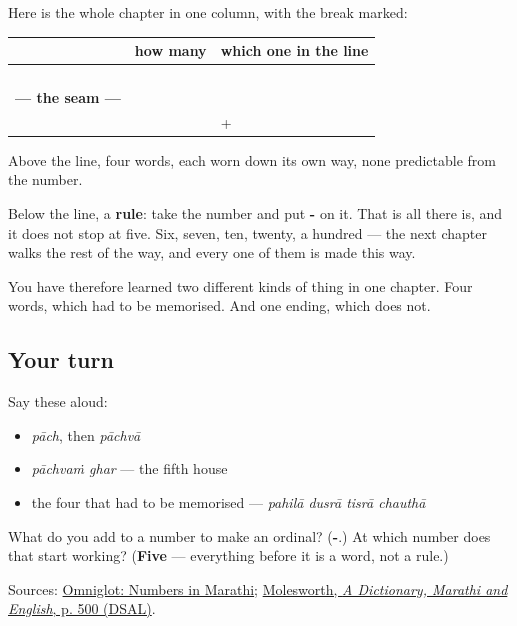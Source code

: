 \begin{grammarlens}[title={Grammar Lens: -\mr{वा}, and where the language changes its mind}]
Here is the whole chapter in one column, with the break marked:

\noindent
\begin{tabularx}{\linewidth}{@{}>{\raggedright\arraybackslash}X>{\raggedright\arraybackslash}X>{\raggedright\arraybackslash}X@{}}
\toprule
\textbf{} & \textbf{how many} & \textbf{which one in the line} \\
\midrule
 & \textbf{\mr{एक}} & \textbf{\mr{पहिला}} \\
 & \textbf{\mr{दोन}} & \textbf{\mr{दुसरा}} \\
 & \textbf{\mr{तीन}} & \textbf{\mr{तिसरा}} \\
 & \textbf{\mr{चार}} & \textbf{\mr{चौथा}} \\
\textbf{— the seam —} &  &  \\
 & \textbf{\mr{पाच}} & \textbf{\mr{पाच}} + \textbf{\mr{वा}} \\
\bottomrule
\end{tabularx}

Above the line, four words, each worn down its own way, none predictable from the number.

Below the line, a \textbf{rule}: take the number and put \textbf{-} on it. That is all there is, and it does not stop at five. Six, seven, ten, twenty, a hundred — the next chapter walks the rest of the way, and every one of them is made this way.

You have therefore learned two different kinds of thing in one chapter. Four words, which had to be memorised. And one ending, which does not.
\end{grammarlens}

\subsection*{Your turn}
Say these aloud:

\begin{itemize}
\raggedright
  \item \emph{pāch}, then \emph{pāchvā}
  \item \emph{pāchvaṁ ghar} — the fifth house
  \item the four that had to be memorised — \emph{pahilā dusrā tisrā chauthā}
\end{itemize}

\begin{tcolorbox}[breakable,colback=teal!4,colframe=teal!35!black,title={Before you move on}]
What do you add to a number to make an ordinal? (\textbf{-}.) At which number does that start working? (\textbf{Five} — everything before it is a word, not a rule.)

Sources: \href{https://www.omniglot.com/language/numbers/marathi.htm}{Omniglot: Numbers in Marathi}; \href{https://dsal.uchicago.edu/cgi-bin/app/molesworth\_query.py?qs=\%E0\%A4\%AA\%E0\%A4\%BE\%E0\%A4\%9A\%E0\%A4\%B5\%E0\%A4\%BE\&searchhws=yes}{Molesworth, \emph{A Dictionary, Marathi and English}, p. 500 (DSAL)}.
\end{tcolorbox}
